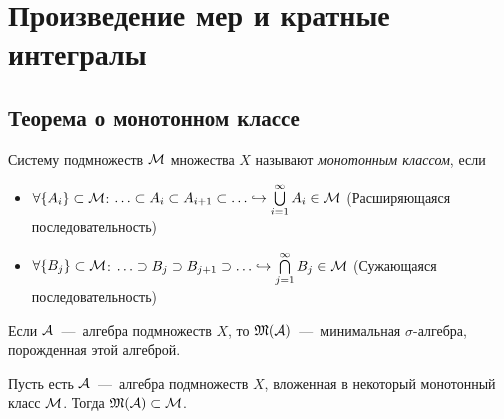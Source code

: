 \section{Произведение мер и кратные интегралы}
\subsection{Теорема о монотонном классе}
\begin{definition}
    Систему подмножеств $\mathcal{M}$ множества $X$ называют \textit{монотонным классом}, если 
    \begin{itemize}
        \item $\forall \{A_i\} \subset \mathcal{M}$: $\ldots \subset A_i \subset A_{i + 1} \subset \ldots \hookrightarrow \bigcup\limits_{i = 1}^\infty A_i \in \mathcal{M}$ (Расширяющаяся последовательность) 
        \item $\forall \{B_j\} \subset \mathcal{M}$: $\ldots \supset B_j \supset B_{j + 1} \supset \ldots \hookrightarrow \bigcap\limits_{j = 1}^\infty B_j \in \mathcal{M}$ (Сужающаяся последовательность)
    \end{itemize}
\end{definition}
\begin{reminder}
    Если $\mathcal{A}$~---~алгебра подмножеств $X$, то $\mathfrak{M}(\mathcal{A})$~---~минимальная $\sigma$-алгебра, порожденная этой алгеброй.
\end{reminder}
\begin{theorem}
    Пусть есть $\mathcal{A}$~---~алгебра подмножеств $X$, вложенная в некоторый монотонный класс $\mathcal{M}$. Тогда $\mathfrak{M}(\mathcal{A}) \subset \mathcal{M}$.
\end{theorem}
